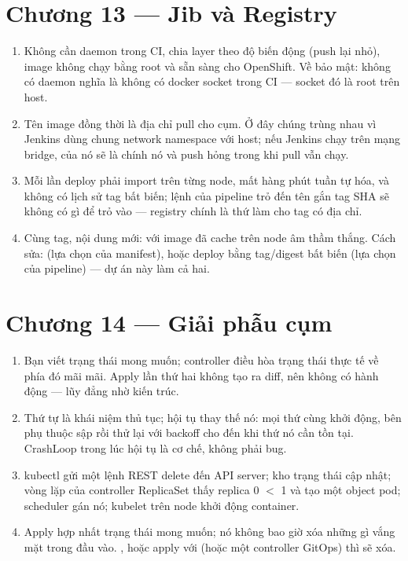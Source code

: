 \section*{Chương 13 --- Jib và Registry}
\begin{enumerate}
  \item Không cần daemon trong CI, chia layer theo độ biến động (push
  lại nhỏ), image không chạy bằng root và sẵn sàng cho OpenShift. Về
  bảo mật: không có daemon nghĩa là không có docker socket trong CI
  --- socket đó là root trên host.
  \item Tên image đồng thời là địa chỉ pull cho cụm. Ở đây chúng trùng
  nhau vì Jenkins dùng chung network namespace với host; nếu Jenkins
  chạy trên mạng bridge,  của nó sẽ là chính nó
  và push hỏng trong khi pull vẫn chạy.
  \item Mỗi lần deploy phải import trên từng node, mất hàng phút tuần
  tự hóa, và không có lịch sử tag bất biến; lệnh  của
  pipeline trỏ đến tên gắn tag SHA sẽ không có gì để trỏ vào ---
  registry chính là thứ làm cho tag có địa chỉ.
  \item Cùng tag, nội dung mới: với  image đã cache
  trên node âm thầm thắng. Cách sửa: 
  (lựa chọn của manifest), hoặc deploy bằng tag/digest bất biến (lựa
  chọn của pipeline) --- dự án này làm cả hai.
\end{enumerate}

\section*{Chương 14 --- Giải phẫu cụm}
\begin{enumerate}
  \item Bạn viết trạng thái mong muốn; controller điều hòa trạng thái
  thực tế về phía đó mãi mãi. Apply lần thứ hai không tạo ra diff, nên
  không có hành động --- lũy đẳng nhờ kiến trúc.
  \item Thứ tự là khái niệm thủ tục; hội tụ thay thế nó: mọi thứ cùng
  khởi động, bên phụ thuộc sập rồi thử lại với backoff cho đến khi thứ
  nó cần tồn tại. CrashLoop trong lúc hội tụ là cơ chế, không phải
  bug.
  \item kubectl gửi một lệnh REST delete đến API server; kho trạng
  thái cập nhật; vòng lặp của controller ReplicaSet thấy replica 0 $<$ 1
  và tạo một object pod; scheduler gán nó; kubelet trên node khởi động
  container.
  \item Apply hợp nhất trạng thái mong muốn; nó không bao giờ xóa
  những gì vắng mặt trong đầu vào. , hoặc apply với  (hoặc một
  controller GitOps) thì sẽ xóa.
\end{enumerate}

